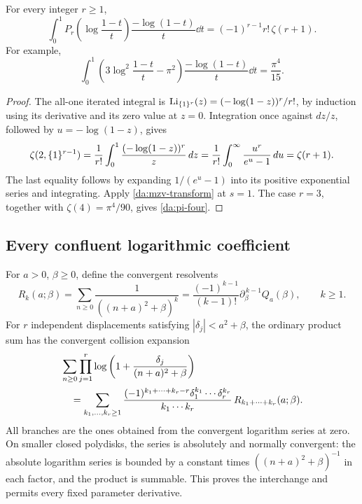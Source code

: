 \begin{corollary}
\label{da:zeta-integral}
For every integer \(r\ge1\),
\begin{equation}\label{da:zeta-integral-formula}
 \int_0^1P_r\!\left(\log\frac{1-t}{t}\right)
       \frac{-\log(1-t)}t\dd t
     =(-1)^{r-1}r!\,\zeta(r+1).
\end{equation}
For example,
\begin{equation}\label{da:pi-four}
 \boxed{\displaystyle
 \int_0^1\left(3\log^2\frac{1-t}{t}-\pi^2\right)
             \frac{-\log(1-t)}t\dd t=\frac{\pi^4}{15}.}
\end{equation}
\end{corollary}

\begin{proof}
The all-one iterated integral is
\(\operatorname{Li}_{\{1\}^{r}}(z)=(-\log(1-z))^r/r!\), by induction using its
derivative and its zero value at \(z=0\). Integration once against
\(dz/z\), followed by \(u=-\log(1-z)\), gives
\[
 \zeta(2,\{1\}^{r-1})
  =\frac1{r!}\int_0^1\frac{(-\log(1-z))^r}{z}\,d z
  =\frac1{r!}\int_0^\infty\frac{u^r}{e^u-1}\,d u
  =\zeta(r+1).
\]
The last equality follows by expanding \(1/(e^u-1)\) into its
positive exponential series and integrating. Apply
\eqref{da:mzv-transform} at \(s=1\). The case \(r=3\), together with
\(\zeta(4)=\pi^4/90\), gives \eqref{da:pi-four}.
\end{proof}

\subsection{Every confluent logarithmic coefficient}

For \(a>0\), \(\beta\ge0\), define the convergent resolvents
\[
 R_k(a;\beta)=\sum_{n\ge0}\frac1{((n+a)^2+\beta)^k}
   =\frac{(-1)^{k-1}}{(k-1)!}\partial_\beta^{\,k-1}Q_a(\beta),
 \qquad k\ge1.
\]
For \(r\) independent displacements satisfying
\(|\delta_j|<a^2+\beta\), the ordinary product sum has the convergent
collision expansion
\begin{align}
 &\sum_{n\ge0}\prod_{j=1}^r
     \log\left(1+\frac{\delta_j}{(n+a)^2+\beta}\right)\notag\\
 &\quad=
 \sum_{k_1,\ldots,k_r\ge1}
   \frac{(-1)^{k_1+\cdots+k_r-r}
             \delta_1^{k_1}\cdots\delta_r^{k_r}}
        {k_1\cdots k_r}\,
       R_{k_1+\cdots+k_r}(a;\beta).
 \label{da:independent-collision}
\end{align}
All branches are the ones obtained from the convergent logarithm series
at zero. On smaller closed polydisks, the series is absolutely and normally
convergent: the absolute logarithm series is bounded by a constant times
\(((n+a)^2+\beta)^{-1}\) in each factor, and the product is summable.
This proves the interchange and permits every fixed parameter derivative.

